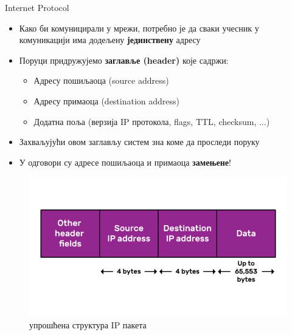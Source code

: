 \documentclass{beamer}
\begin{document}
    \begin{frame}[allowframebreaks]{Internet Protocol}
        \begin{itemize}
            \item Како би комуницирали у мрежи, потребно је да сваки учесник у комуникацији има додељену \textbf{јединствену} адресу
            \item Поруци придружујемо \textbf{заглавље (header)} које садржи:
            \begin{itemize}
                \item Адресу пошиљаоца (source address)
                \item Адресу примаоца (destination address)
                \item Додатна поља (верзија IP протокола, flags, TTL, checksum, ...)
            \end{itemize}
            \item Захваљујући овом заглављу систем зна коме да проследи поруку
            \item У одговори су адресе пошиљаоца и примаоца \textbf{замењене}!
        \end{itemize}

        \framebreak

        \begin{figure}
            \centering
            \includegraphics[width=\textwidth,height=\textheight,keepaspectratio]{images/ip.png}
            \caption{упрошћена структура IP пакета}
            \label{fig:ip}
        \end{figure}
    \end{frame}
\end{document}
